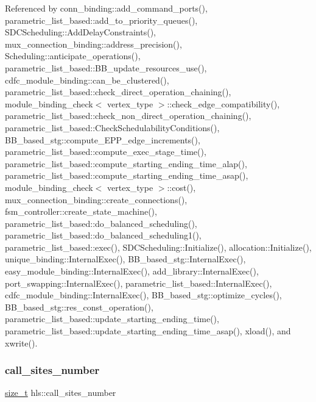 Referenced by conn\+\_\+binding\+::add\+\_\+command\+\_\+ports(), parametric\+\_\+list\+\_\+based\+::add\+\_\+to\+\_\+priority\+\_\+queues(), S\+D\+C\+Scheduling\+::\+Add\+Delay\+Constraints(), mux\+\_\+connection\+\_\+binding\+::address\+\_\+precision(), Scheduling\+::anticipate\+\_\+operations(), parametric\+\_\+list\+\_\+based\+::\+B\+B\+\_\+update\+\_\+resources\+\_\+use(), cdfc\+\_\+module\+\_\+binding\+::can\+\_\+be\+\_\+clustered(), parametric\+\_\+list\+\_\+based\+::check\+\_\+direct\+\_\+operation\+\_\+chaining(), module\+\_\+binding\+\_\+check$<$ vertex\+\_\+type $>$\+::check\+\_\+edge\+\_\+compatibility(), parametric\+\_\+list\+\_\+based\+::check\+\_\+non\+\_\+direct\+\_\+operation\+\_\+chaining(), parametric\+\_\+list\+\_\+based\+::\+Check\+Schedulability\+Conditions(), B\+B\+\_\+based\+\_\+stg\+::compute\+\_\+\+E\+P\+P\+\_\+edge\+\_\+increments(), parametric\+\_\+list\+\_\+based\+::compute\+\_\+exec\+\_\+stage\+\_\+time(), parametric\+\_\+list\+\_\+based\+::compute\+\_\+starting\+\_\+ending\+\_\+time\+\_\+alap(), parametric\+\_\+list\+\_\+based\+::compute\+\_\+starting\+\_\+ending\+\_\+time\+\_\+asap(), module\+\_\+binding\+\_\+check$<$ vertex\+\_\+type $>$\+::cost(), mux\+\_\+connection\+\_\+binding\+::create\+\_\+connections(), fsm\+\_\+controller\+::create\+\_\+state\+\_\+machine(), parametric\+\_\+list\+\_\+based\+::do\+\_\+balanced\+\_\+scheduling(), parametric\+\_\+list\+\_\+based\+::do\+\_\+balanced\+\_\+scheduling1(), parametric\+\_\+list\+\_\+based\+::exec(), S\+D\+C\+Scheduling\+::\+Initialize(), allocation\+::\+Initialize(), unique\+\_\+binding\+::\+Internal\+Exec(), B\+B\+\_\+based\+\_\+stg\+::\+Internal\+Exec(), easy\+\_\+module\+\_\+binding\+::\+Internal\+Exec(), add\+\_\+library\+::\+Internal\+Exec(), port\+\_\+swapping\+::\+Internal\+Exec(), parametric\+\_\+list\+\_\+based\+::\+Internal\+Exec(), cdfc\+\_\+module\+\_\+binding\+::\+Internal\+Exec(), B\+B\+\_\+based\+\_\+stg\+::optimize\+\_\+cycles(), B\+B\+\_\+based\+\_\+stg\+::res\+\_\+const\+\_\+operation(), parametric\+\_\+list\+\_\+based\+::update\+\_\+starting\+\_\+ending\+\_\+time(), parametric\+\_\+list\+\_\+based\+::update\+\_\+starting\+\_\+ending\+\_\+time\+\_\+asap(), xload(), and xwrite().

\mbox{\label{classhls_a6ea7350c251d688a3c6aa291e4f6ed73}} 
\subsubsection{\texorpdfstring{call\+\_\+sites\+\_\+number}{call\_sites\_number}}
{\footnotesize\ttfamily \hyperlink{tutorial__fpt__2017_2intro_2sixth_2test_8c_a7c94ea6f8948649f8d181ae55911eeaf}{size\+\_\+t} hls\+::call\+\_\+sites\+\_\+number}



